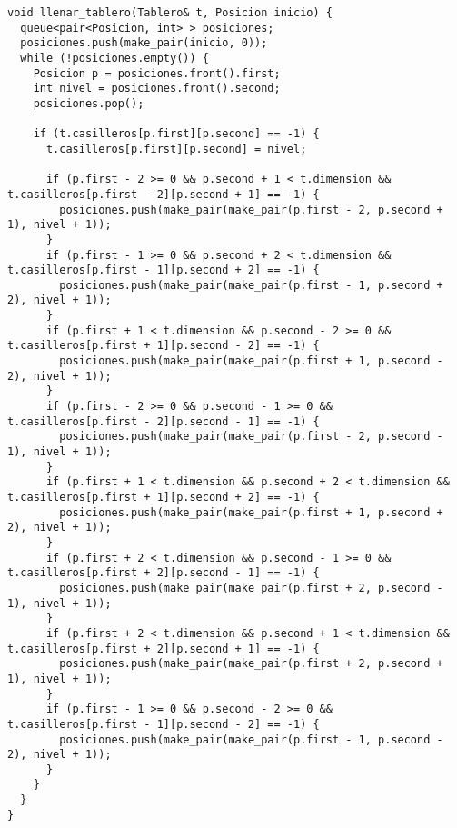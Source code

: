 \documentclass[a4paper]{article}
\begin{document}
\vspace*{0.5cm}


\begin{lstlisting}
void llenar_tablero(Tablero& t, Posicion inicio) {
  queue<pair<Posicion, int> > posiciones;
  posiciones.push(make_pair(inicio, 0));
  while (!posiciones.empty()) {
    Posicion p = posiciones.front().first;
    int nivel = posiciones.front().second;
    posiciones.pop();

    if (t.casilleros[p.first][p.second] == -1) {
      t.casilleros[p.first][p.second] = nivel;

      if (p.first - 2 >= 0 && p.second + 1 < t.dimension && t.casilleros[p.first - 2][p.second + 1] == -1) {
        posiciones.push(make_pair(make_pair(p.first - 2, p.second + 1), nivel + 1));
      }
      if (p.first - 1 >= 0 && p.second + 2 < t.dimension && t.casilleros[p.first - 1][p.second + 2] == -1) {
        posiciones.push(make_pair(make_pair(p.first - 1, p.second + 2), nivel + 1));
      }
      if (p.first + 1 < t.dimension && p.second - 2 >= 0 && t.casilleros[p.first + 1][p.second - 2] == -1) {
        posiciones.push(make_pair(make_pair(p.first + 1, p.second - 2), nivel + 1));
      }
      if (p.first - 2 >= 0 && p.second - 1 >= 0 && t.casilleros[p.first - 2][p.second - 1] == -1) {
        posiciones.push(make_pair(make_pair(p.first - 2, p.second - 1), nivel + 1));
      }
      if (p.first + 1 < t.dimension && p.second + 2 < t.dimension && t.casilleros[p.first + 1][p.second + 2] == -1) {
        posiciones.push(make_pair(make_pair(p.first + 1, p.second + 2), nivel + 1));
      }
      if (p.first + 2 < t.dimension && p.second - 1 >= 0 && t.casilleros[p.first + 2][p.second - 1] == -1) {
        posiciones.push(make_pair(make_pair(p.first + 2, p.second - 1), nivel + 1));
      }
      if (p.first + 2 < t.dimension && p.second + 1 < t.dimension && t.casilleros[p.first + 2][p.second + 1] == -1) {
        posiciones.push(make_pair(make_pair(p.first + 2, p.second + 1), nivel + 1));
      }
      if (p.first - 1 >= 0 && p.second - 2 >= 0 && t.casilleros[p.first - 1][p.second - 2] == -1) {
        posiciones.push(make_pair(make_pair(p.first - 1, p.second - 2), nivel + 1));
      }
    }
  }
}
\end{lstlisting}


\end{document}
